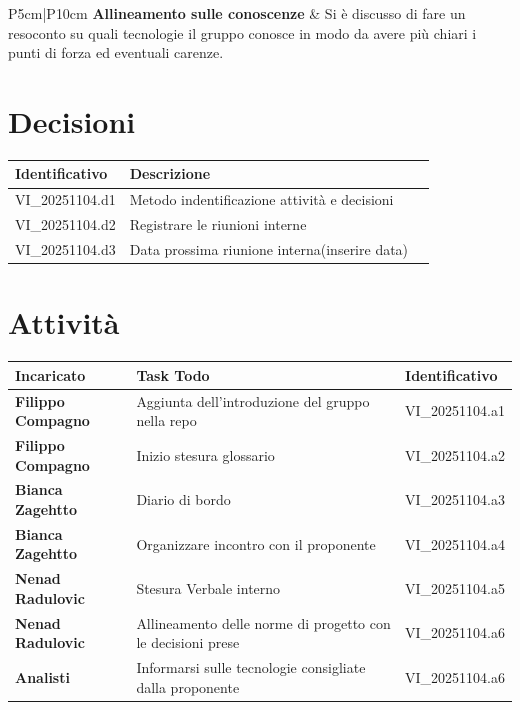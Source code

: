\documentclass[a4paper,12pt]{article}
\begin{document}
\begin{longtable}{P{5cm}|P{10cm}}
    \textbf{Allineamento sulle conoscenze} & Si è discusso di fare un resoconto su quali tecnologie il gruppo conosce in modo da avere più chiari i punti di forza ed eventuali carenze. \\ 
\end{longtable}

\section{Decisioni}
\begin{tabularx}{\textwidth}{|l|X|l|}
    \hline
    \textbf{Identificativo} & \textbf{Descrizione}\\
    \hline
    VI\_20251104.d1 & Metodo indentificazione attività e decisioni\\
    \hline
    VI\_20251104.d2 & Registrare le riunioni interne\\
    \hline
    VI\_20251104.d3 & Data prossima riunione interna(inserire data) \\
    \hline
\end{tabularx}


\section{Attività}
\begin{tabularx}{\textwidth}{|l|X|l|}
    \hline
    \textbf{Incaricato} & \textbf{Task Todo} & \textbf{Identificativo} \\
    \hline
    \textbf{Filippo Compagno} & Aggiunta dell'introduzione del gruppo nella repo & VI\_20251104.a1\\
    \hline
    \textbf{Filippo Compagno} & Inizio stesura glossario & VI\_20251104.a2\\
    \hline
    \textbf{Bianca Zagehtto} & Diario di bordo & VI\_20251104.a3\\
    \hline
    \textbf{Bianca Zagehtto} & Organizzare incontro con il proponente & VI\_20251104.a4\\
    \hline
    \textbf{Nenad Radulovic} & Stesura Verbale interno & VI\_20251104.a5\\
    \hline
    \textbf{Nenad Radulovic} & Allineamento delle norme di progetto con le decisioni prese & VI\_20251104.a6\\
    \hline
    \textbf{Analisti} & Informarsi sulle tecnologie consigliate dalla proponente & VI\_20251104.a6\\

\end{tabularx}
\end{document}
